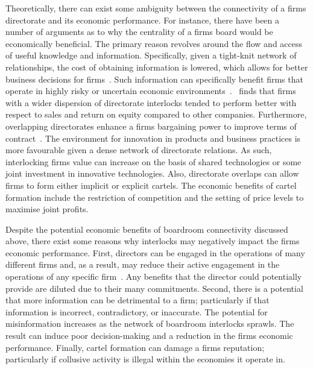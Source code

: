 Theoretically, there can exist some ambiguity between the connectivity of a firms directorate and its economic performance. For instance, there have been a number of arguments as to why the centrality of a firms board would be economically beneficial. The primary reason revolves around the flow and access of useful knowledge and information. Specifically, given a tight-knit network of relationships, the cost of obtaining information is lowered, which allows for better business decisions for firms~\citep{Mizruchi1990}. Such information can specifically benefit firms that operate in highly risky or uncertain economic environments~\citep{Mol2001, NicholsonAlexanderKiel2004}.~\citet{Boyd1990} finds that firms with a wider dispersion of directorate interlocks tended to perform better with respect to sales and return on equity compared to other companies. Furthermore, overlapping directorates enhance a firms bargaining power to improve terms of contract~\citep{SchoormanBazermanAtkin1981}. The environment for innovation in products and business practices is more favourable given a dense network of directorate relations. As such, interlocking firms value can increase on the basis of shared technologies or some joint investment in innovative technologies. Also, directorate overlaps can allow firms to form either implicit or explicit cartels. The economic benefits of cartel formation include the restriction of competition and the setting of price levels to maximise joint profits.

Despite the potential economic benefits of boardroom connectivity discussed above, there exist some reasons why interlocks may negatively impact the firms economic performance. First, directors can be engaged in the operations of many different firms and, as a result, may reduce their active engagement in the operations of any specific firm~\citep{FichShivdasani2006, FichWhite2005}. Any benefits that the director could potentially provide are diluted due to their many commitments. Second, there is a potential that more information can be detrimental to a firm; particularly if that information is incorrect, contradictory, or inaccurate. The potential for misinformation increases as the network of boardroom interlocks sprawls. The result can induce poor decision-making and a reduction in the firms economic performance. Finally, cartel formation can damage a firms reputation; particularly if collusive activity is illegal within the economies it operate in.

